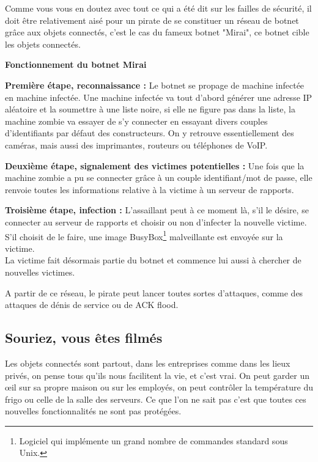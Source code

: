\documentclass[a4paper]{report}
\begin{document}
	Comme vous vous en doutez avec tout ce qui a été dit sur les failles de sécurité, il doit être relativement aisé pour un pirate
	de se constituer un réseau de botnet grâce aux objets connectés, c'est le cas du fameux botnet "Mirai", ce botnet cible les objets
	connectés.
	
	\bigbreak
	
	\begin{flushleft}
		\textbf{Fonctionnement du botnet Mirai} \\
	\end{flushleft}
	
	\textbf{Première étape, reconnaissance :} Le botnet se propage de machine infectée en machine infectée. Une machine infectée 
	va tout d'abord générer une adresse IP aléatoire et la soumettre à une liste noire, si elle ne figure pas dans la liste, 
	la machine zombie va essayer de s'y connecter en essayant divers couples d'identifiants par défaut des constructeurs. On y retrouve 
	essentiellement des caméras, mais aussi des imprimantes, routeurs ou téléphones de VoIP.
	
	\medbreak

	\textbf{Deuxième étape, signalement des victimes potentielles :} Une fois que la machine zombie a pu se connecter grâce à un couple
	identifiant/mot de passe, elle renvoie toutes les informations relative à la victime à un serveur de rapports.
	
	\medbreak
	
	\textbf{Troisième étape, infection :} L'assaillant peut à ce moment là, s'il le désire, se connecter au serveur de rapports et choisir
	ou non d'infecter la nouvelle victime. S'il choisit de le faire, une image
	BusyBox\footnote{Logiciel qui implémente un grand nombre de commandes standard sous Unix.} malveillante est envoyée sur la victime. \\
	La victime fait désormais partie du botnet et commence lui aussi à chercher de nouvelles victimes.
	
	\medbreak
	A partir de ce réseau, le pirate peut lancer toutes sortes d'attaques, comme des attaques de dénis de service ou de ACK flood.
	
	\subsection{Souriez, vous êtes filmés}
	Les objets connectés sont partout, dans les entreprises comme dans les lieux privés, on pense tous qu'ils nous facilitent la vie, et c'est vrai. On peut garder un œil sur sa propre maison ou sur les employés, on peut contrôler la température du frigo ou celle de la salle des serveurs. Ce que l'on ne sait pas c'est que toutes ces nouvelles fonctionnalités ne sont pas protégées.\\ 
	
\end{document}
